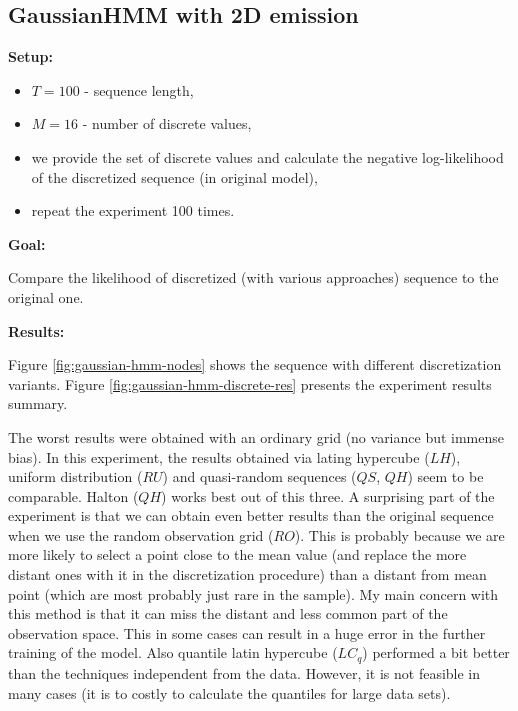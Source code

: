 \documentclass[shortabstract]{iithesis}
\begin{document}
\subsection{GaussianHMM with 2D emission}

\textbf{Setup:}

\begin{itemize}
    \item $T = 100$ - sequence length,
    \item $M = 16$ - number of  discrete values,
    \item we provide the set of discrete values and calculate the negative log-likelihood of the discretized sequence (in original model),
    \item repeat the experiment 100 times.
\end{itemize}

\textbf{Goal:}

Compare the likelihood of  discretized  (with various approaches) sequence to the original one. 

\textbf{Results:}

Figure \ref{fig:gaussian-hmm-nodes} shows the sequence with different discretization variants.  Figure \ref{fig:gaussian-hmm-discrete-res} presents the experiment results summary. 

The worst results were obtained with an ordinary grid (no variance but immense bias). In this experiment, the results obtained via lating hypercube ($LH$), uniform distribution ($RU$) and quasi-random sequences ($QS$, $QH$) seem to be comparable. Halton ($QH$) works best out of this three. A surprising part of the experiment is that we can obtain even better results than the original sequence when we use the random observation grid ($RO$). This is probably because  we are more likely to select a point close to the mean value (and replace the more distant ones with it in the discretization procedure) than a distant from mean point (which are most probably just rare in the sample). My main concern with this method is that it can miss the distant and less common part of the observation space. This in some cases can result in a huge error in the further training of the model. Also quantile latin hypercube ($LC_q$) performed a bit better than the techniques independent from the data. However, it is not feasible in many cases (it  is to costly to calculate the quantiles for  large data sets). 

\pagebreak
\end{document}
